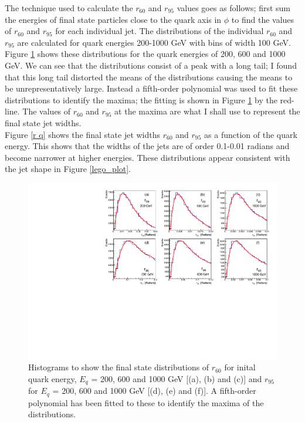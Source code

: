 \documentclass[a4paper,11pt, onecolumn]{article}
\begin{document}
  The technique used to calculate the $r_{60}$ and $r_{95}$ values goes as follows; first sum the energies of final state particles close to the 
  quark axis in $\phi$ to find the values of $r_{60}$ and $r_{95}$ for each individual jet. 
  The distributions of the individual $r_{60}$ and $r_{95}$ are calculated for quark energies 200-1000 
  GeV with bins of width 100 GeV. Figure \ref{r q distr} shows these distributions for the quark energies of 200, 600 and 1000 GeV.
  We can see that the distributions consist of a peak with a long tail; I found that this long tail distorted the means of the distributions 
  causing the means to be unrepresentatively large. Instead a fifth-order polynomial was used to fit these distributions to identify the maxima; 
  the fitting is shown in Figure \ref{r q distr} by the red-line. 
  The values of $r_{60}$ and $r_{95}$ at the maxima are what I shall use to represent the final state jet widths. \\

  Figure \ref{r q} shows the final state jet widths $r_{60}$ and $r_{95}$ as a function of the quark energy. 
  This shows that the widths of the jets are of order 0.1-0.01 radians and
  become narrower at higher energies. These distributions appear consistent with the jet shape in Figure \ref{lego_plot}. \\


  \begin{figure}[htb]
    \begin{center}
      \includegraphics[width = \textwidth]{r_q_distr}
      \caption{Histograms to show the final state distributions of $r_{60}$ for inital quark energy, $E_{q}$ = 200, 600 and 1000 GeV [(a), (b) and (c)]
               and $r_{95}$ for $E_{q}$ = 200, 600 and 1000 GeV [(d), (e) and (f)]. A fifth-order polynomial has been
               fitted to these to identify the maxima of the distributions.}
      \label{r q distr}
    \end{center}
  \end{figure}
  
\end{document}
